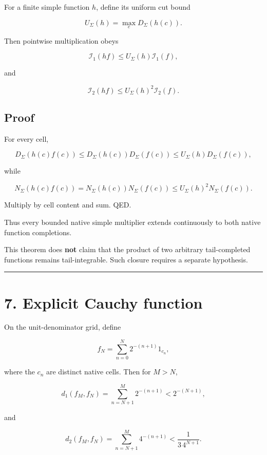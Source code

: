 For a finite simple function \(h\), define its uniform cut bound

\[
\boxed{
U_\Sigma(h)=\max_c D_\Sigma(h(c)).
}
\tag{6.1}
\]

Then pointwise multiplication obeys

\[
\boxed{
\mathcal I_1(hf)
\le U_\Sigma(h)\mathcal I_1(f),
}
\tag{6.2}
\]

and

\[
\boxed{
\mathcal I_2(hf)
\le U_\Sigma(h)^2\mathcal I_2(f).
}
\tag{6.3}
\]

\hypertarget{proof-2}{%
\subsection{Proof}\label{proof-2}}

For every cell,

\[
D_\Sigma(h(c)f(c))
\le D_\Sigma(h(c))D_\Sigma(f(c))
\le U_\Sigma(h)D_\Sigma(f(c)),
\]

while

\[
N_\Sigma(h(c)f(c))
=N_\Sigma(h(c))N_\Sigma(f(c))
\le U_\Sigma(h)^2N_\Sigma(f(c)).
\]

Multiply by cell content and sum. QED.

Thus every bounded native simple multiplier extends continuously to both native
function completions.

This theorem does \textbf{not} claim that the product of two arbitrary tail-completed
functions remains tail-integrable. Such closure requires a separate hypothesis.

\begin{center}\rule{0.5\linewidth}{0.5pt}\end{center}

\hypertarget{explicit-cauchy-function}{%
\section{7. Explicit Cauchy function}\label{explicit-cauchy-function}}

On the unit-denominator grid, define

\[
f_N
=
\sum_{n=0}^{N}
2^{-(n+1)}1_{c_n},
\tag{7.1}
\]

where the \(c_n\) are distinct native cells. Then for \(M>N\),

\[
d_1(f_M,f_N)
=
\sum_{n=N+1}^{M}2^{-(n+1)}
<2^{-(N+1)},
\tag{7.2}
\]

and

\[
d_2(f_M,f_N)
=
\sum_{n=N+1}^{M}4^{-(n+1)}
<\frac{1}{3\,4^{N+1}}.
\tag{7.3}
\]

